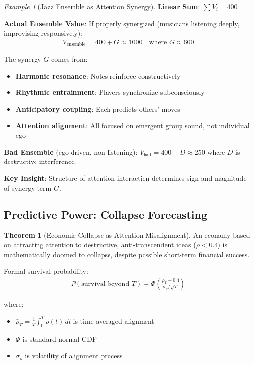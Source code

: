 \documentclass[11pt,a4paper]{article}
\theoremstyle{definition}
\newtheorem{theorem}{Theorem}[section]
\theoremstyle{remark}
\newtheorem{example}{Example}[section]
\begin{document}
\begin{small}
\begin{example}[Jazz Ensemble as Attention Synergy]
\textbf{Linear Sum}: \(\sum V_i = 400\)

\textbf{Actual Ensemble Value}: If properly synergized (musicians listening deeply, improvising responsively):
\begin{align}
V_{\text{ensemble}} = 400 + G \approx 1000 \quad \text{where } G \approx 600
\end{align}

The synergy \(G\) comes from:
\begin{itemize}
    \item \textbf{Harmonic resonance}: Notes reinforce constructively
    \item \textbf{Rhythmic entrainment}: Players synchronize subconsciously
    \item \textbf{Anticipatory coupling}: Each predicts others' moves
    \item \textbf{Attention alignment}: All focused on emergent group sound, not individual ego
\end{itemize}

\textbf{Bad Ensemble} (ego-driven, non-listening): \(V_{\text{bad}} = 400 - D \approx 250\) where \(D\) is destructive interference.

\textbf{Key Insight}: Structure of attention interaction determines sign and magnitude of synergy term \(G\).
\end{example}

\subsection{Predictive Power: Collapse Forecasting}

\begin{theorem}[Economic Collapse as Attention Misalignment]
An economy based on attracting attention to destructive, anti-transcendent ideas (\(\rho < 0.4\)) is mathematically doomed to collapse, despite possible short-term financial success.

Formal survival probability:
\begin{align}
P(\text{survival beyond } T) = \Phi\left(\frac{\bar{\rho}_T - 0.4}{\sigma_{\rho}/\sqrt{T}}\right)
\end{align}

where:
\begin{itemize}
    \item \(\bar{\rho}_T = \frac{1}{T} \int_0^T \rho(t) \, dt\) is time-averaged alignment
    \item \(\Phi\) is standard normal CDF
    \item \(\sigma_{\rho}\) is volatility of alignment process
\end{itemize}


\end{theorem}
\end{small}
\end{document}
